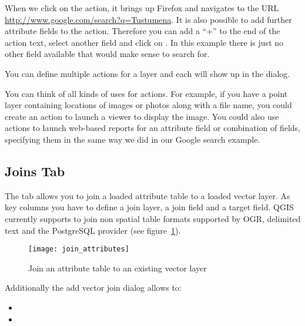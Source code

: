 When we click on the action, it brings up Firefox and navigates to the URL
\url{http://www.google.com/search?q=Tustumena}. It is also possible to add further
attribute fields to the action. Therefore you can add a ``+'' to the end of the action
text, select another field and click on . In this example there
is just no other field available that would make sense to search for.

You can define multiple actions for a layer and each will show up in the
 dialog.

You can think of all kinds of uses for actions. For example, if you have a point layer
containing locations of images or photos along with a file name, you could
create an action to launch a viewer to display the image. You could also use
actions to launch web-based reports for an attribute field or combination of
fields, specifying them in the same way we did in our Google search example.

\subsection{Joins Tab}\label{sec:joins}

The  tab allows you to join a loaded attribute table to a loaded 
vector layer. As key columns you have to define a join layer, a join field and 
a target field. QGIS currently supports to join non spatial table formats 
supported by OGR, delimited text and the PostgreSQL provider (see figure~\ref{fig:join_attributes}).

\begin{figure}[ht]
   \centering
   \texttt{[image: join\_attributes]}
   \caption{Join an attribute table to an existing vector layer \nixcaption}
   \label{fig:join_attributes}
\end{figure}

Additionally the add vector join dialog allows to: 

\begin{itemize}[label=--]
\item {}
\item {}
\end{itemize}

